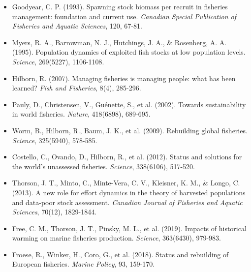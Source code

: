 \documentclass[a4paper, 11pt]{article}
\begin{document}
\begin{itemize}
\item Goodyear, C. P. (1993). Spawning stock biomass per recruit in fisheries management:
foundation and current use. \textit{Canadian Special Publication of Fisheries and Aquatic
Sciences}, 120, 67-81.

\item Myers, R. A., Barrowman, N. J., Hutchings, J. A., \& Rosenberg, A. A. (1995).
Population dynamics of exploited fish stocks at low population levels. \textit{Science},
269(5227), 1106-1108.

\item Hilborn, R. (2007). Managing fisheries is managing people: what has been learned?
\textit{Fish and Fisheries}, 8(4), 285-296.

\item Pauly, D., Christensen, V., Guénette, S., et al. (2002). Towards sustainability
in world fisheries. \textit{Nature}, 418(6898), 689-695.

\item Worm, B., Hilborn, R., Baum, J. K., et al. (2009). Rebuilding global fisheries.
\textit{Science}, 325(5940), 578-585.

\item Costello, C., Ovando, D., Hilborn, R., et al. (2012). Status and solutions for
the world's unassessed fisheries. \textit{Science}, 338(6106), 517-520.

\item Thorson, J. T., Minto, C., Minte-Vera, C. V., Kleisner, K. M., \& Longo, C. (2013).
A new role for effort dynamics in the theory of harvested populations and data-poor stock
assessment. \textit{Canadian Journal of Fisheries and Aquatic Sciences}, 70(12), 1829-1844.

\item Free, C. M., Thorson, J. T., Pinsky, M. L., et al. (2019). Impacts of historical
warming on marine fisheries production. \textit{Science}, 363(6430), 979-983.

\item Froese, R., Winker, H., Coro, G., et al. (2018). Status and rebuilding of European
fisheries. \textit{Marine Policy}, 93, 159-170.
\end{itemize}
\end{document}
